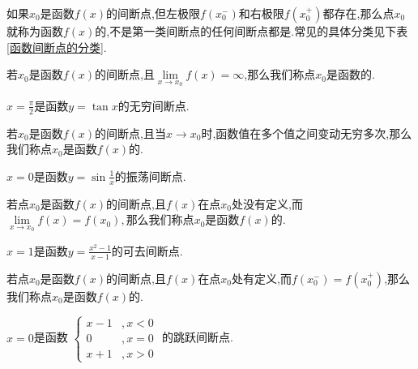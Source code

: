 如果$x_0$是函数$f(x)$的间断点,但左极限$f(x_0^-)$和右极限$f(x_0^+)$都存在,那么点$x_0$就称为函数$f(x)$的,不是第一类间断点的任何间断点都是.常见的具体分类见下表\ref{函数间断点的分类}.
\begin{table}[!htb]
	\centering
	\renewcommand{\arraystretch}{1}
	\caption{函数间断点的分类}
	\renewcommand{\arraystretch}{1}
	\label{函数间断点的分类}
\end{table} 
\vspace*{-1em}

若$x_0$是函数$f(x)$的间断点,且$\lim\limits_{x \to x_0}f(x)=\infty $,那么我们称点$x_0$是函数的.\jg

\simpleexamples $\displaystyle x=\frac{\pi}{2}$是函数$y=\tan x$的无穷间断点.

若$x_0$是函数$f(x)$的间断点,且当$x \to x_0$时,函数值在多个值之间变动无穷多次,那么我们称点$x_0$是函数$f(x)$的.\jg

\simpleexamples $\displaystyle x = 0$是函数$\displaystyle y =\sin\frac{1}{x}$的振荡间断点.

\vspace*{-1em}

若点$x_0$是函数$f(x)$的间断点,且$f(x)$在点$x_0$处没有定义,而$\lim\limits_{x \to x_0}f(x)=f(x_0),$那么我们称点$x_0$是函数$f(x)$的.\jg

\simpleexamples $\displaystyle x=1$是函数$\displaystyle y=\frac{x^2-1}{x-1}$的可去间断点.

若点$x_0$是函数$f(x)$的间断点,且$f(x)$在点$x_0$处有定义,而$f(x_0^-)=f(x_0^+)$,那么我们称点$x_0$是函数$f(x)$的.

\simpleexamples $\displaystyle x=0$是函数
$
\displaystyle
\begin{cases}
x-1&,x<0\\
0&,x=0\\
x+1&,x>0
\end{cases}
$
的跳跃间断点.

